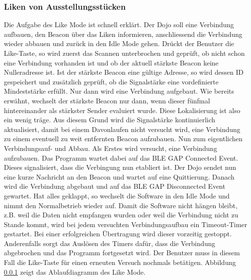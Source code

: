\subsubsection{Liken von Ausstellungsstücken}
Die Aufgabe des Like Mode ist schnell erklärt. Der Dojo soll eine Verbindung aufbauen, den Beacon über das Liken informieren, anschliessend die Verbindung wieder abbauen und zurück in den Idle Mode gehen.
Drückt der Benutzer die Like-Taste, so wird zuerst das Scannen unterbrochen und geprüft, ob nicht schon eine Verbindung vorhanden ist und ob der aktuell stärkste Beacon keine Nulleradresse ist. Ist der stärkste Beacon eine gültige Adresse, so wird dessen ID gespeichert und zusätzlich geprüft, ob die Signalstärke eine vordefinierte Mindeststärke erfüllt. Nur dann wird eine Verbindung aufgebaut. Wie bereits erwähnt, wechselt der stärkste Beacon nur dann, wenn dieser fünfmal hintereinander als stärkster Sender evaluiert wurde. Diese Lokalisierung ist also ein wenig träge. Aus diesem Grund wird die Signalstärke kontinuierlich aktualisiert, damit bei einem Davonlaufen nicht versucht wird, eine Verbindung zu einem eventuell zu weit entfernten Beacon aufzubauen.
Nun zum eigentlichen Verbindungsauf- und Abbau. Als Erstes wird versucht, eine Verbindung aufzubauen. Das Programm wartet dabei auf das BLE GAP Connected Event. Dieses signalisiert, dass die Verbingung nun etabliert ist. Der Dojo sendet nun eine kurze Nachricht an den Beacon und wartet auf eine Quittierung. Danach wird die Verbindung abgebaut und auf das BLE GAP Disconnected Event gewartet. Hat alles geklappt, so wechselt die Software in den Idle Mode und nimmt den Normalbetrieb wieder auf. Damit die Software nicht hängen bleibt, z.B. weil die Daten nicht empfangen wurden oder weil die Verbindung nicht zu Stande kommt, wird bei jedem versuchten Verbindungsaufbau ein Timeout-Timer gestartet. Bei einer erfolgreichen Übertragung wird dieser vorzeitig gestoppt. Anderenfalls sorgt das Auslösen des Timers dafür, dass die Verbindung abgebrochen und das Programm fortgesetzt wird. Der Benutzer muss in diesem Fall die Like-Taste für einen erneuten Versuch nochmals betätigen. Abbildung \ref{} zeigt das Ablaufdiagramm des Like Mode.
